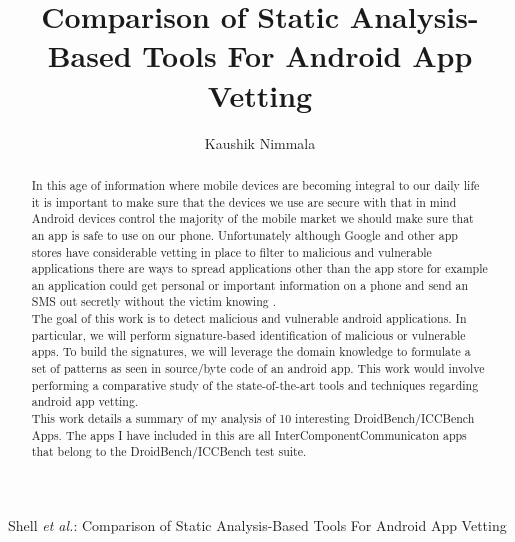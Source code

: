 \documentclass[journal]{IEEEtran}
\begin{document}
%
\title{Comparison of Static Analysis-Based Tools For Android App Vetting }
%

\author{Kaushik Nimmala}



%
{Shell \MakeLowercase{\textit{et al.}}: Comparison of Static Analysis-Based Tools For Android App Vetting}


\maketitle

\begin{abstract}
In this age of information where mobile devices are becoming integral to our daily life it is important to make sure that the devices we use are secure with that in mind Android devices control the majority of the mobile market we should make sure that an app is safe to use on our phone. Unfortunately although Google and other app stores have considerable vetting in place to filter to malicious and vulnerable applications there are ways to spread applications other than the app store for example an application could get personal or important information on a phone and send an SMS out secretly without the victim knowing .\\
The goal of this work is to detect malicious and vulnerable android applications. In particular, we will perform signature-based identification of malicious or vulnerable apps. To build the signatures, we will leverage the domain knowledge to formulate a set of patterns as seen in source/byte code of an android app. This work would involve performing a comparative study of the state-of-the-art tools and techniques regarding android app vetting. \\
This work details a summary of my analysis of 10 interesting DroidBench/ICCBench Apps. The apps I have included in this are all InterComponentCommunicaton apps that belong to the DroidBench/ICCBench test suite. 
\end{abstract}
\end{document}
